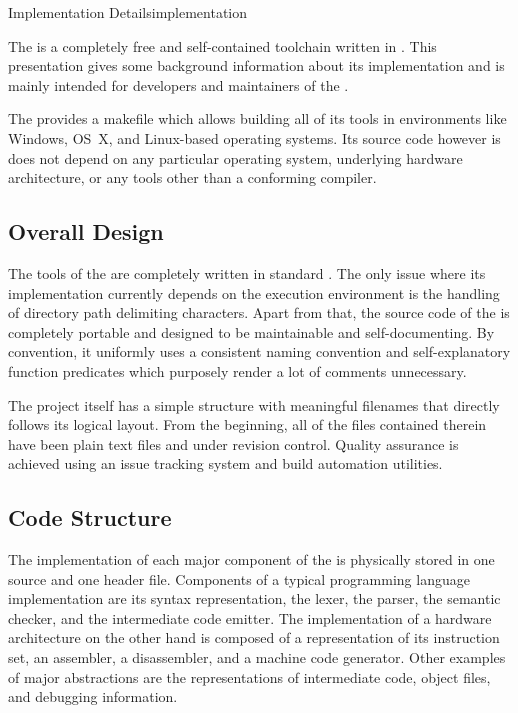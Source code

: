 \begin{presentation}{Implementation Details}{implementation}

The \ecs{} is a completely free and self-contained toolchain written in \cpp{}.
This presentation gives some background information about its implementation and is mainly intended for developers and maintainers of the \ecs{}.


The \ecs{} provides a makefile which allows building all of its tools in environments like Windows, OS~X, and Linux-based operating systems.
Its source code however is does not depend on any particular operating system, underlying hardware architecture, or any tools other than a conforming \cpp{} compiler.

\subsection{Overall Design}

The tools of the \ecs{} are completely written in standard \cpp{}.
The only issue where its implementation currently depends on the execution environment is the handling of directory path delimiting characters.
Apart from that, the source code of the \ecs{} is completely portable and designed to be maintainable and self-documenting.
By convention, it uniformly uses a consistent naming convention and self-explanatory function predicates which purposely render a lot of comments unnecessary.


The project itself has a simple structure with meaningful filenames that directly follows its logical layout.
From the beginning, all of the files contained therein have been plain text files and under revision control.
Quality assurance is achieved using an issue tracking system and build automation utilities.

\subsection{Code Structure}

The implementation of each major component of the \ecs{} is physically stored in one source and one header file.
Components of a typical programming language implementation are its syntax representation, the lexer, the parser, the semantic checker, and the intermediate code emitter.
The implementation of a hardware architecture on the other hand is composed of a representation of its instruction set, an assembler, a disassembler, and a machine code generator.
Other examples of major abstractions are the representations of intermediate code, object files, and debugging information.


\end{presentation}
